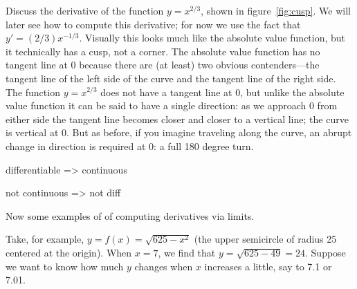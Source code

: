 \begin{example}
Discuss the derivative of the function $y=x^{2/3}$, shown in
figure~\ref{fig:cusp}. We will later see how to compute this
derivative; for now we use the fact that $
y'=(2/3)x^{-1/3}$. Visually this looks much like the absolute value
function, but it technically has a cusp, not a corner. The absolute
value function has no tangent line at 0 because there are (at least)
two obvious contenders---the tangent line of the left side of the
curve and the tangent line of the right side.  The function $
y=x^{2/3}$ does not have a tangent line at 0, but unlike the absolute
value function it can be said to have a single direction: as we
approach 0 from either side the tangent line becomes closer and closer
to a vertical line; the curve is vertical at 0. But as before, if you
imagine traveling along the curve, an abrupt change in direction is
required at 0: a full 180 degree turn.
\end{example}







differentiable => continuous

not continuous => not diff


Now some examples of of computing derivatives via limits. 














Take, for example, $y=f(x)=\sqrt{625-x^2}$ (the upper semicircle of radius
25 centered at the origin).  When $x=7$, we find that $y=\sqrt{625-49}=24$.
Suppose we want to know how much $y$ changes when $x$ increases a little,
say to 7.1 or 7.01.


